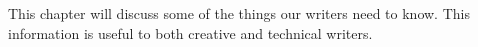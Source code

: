 
This chapter will discuss some of the things our writers need to know. This information is useful to both creative and technical writers.



\StopChapter

